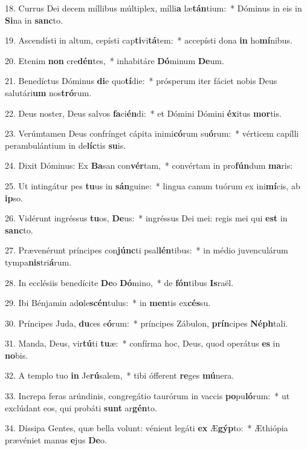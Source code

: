 18. Currus Dei decem míllibus múltiplex, mílli\textbf{a} læ\textbf{tán}tium:~*  Dóminus in eis in \textbf{Si}na in \textbf{sanc}to.\

19. Ascendísti in altum, cepísti cap\textbf{ti}vi\textbf{tá}tem:~*  accepísti dona \textbf{in} ho\textbf{mí}nibus.\

20. Etenim \textbf{non} cre\textbf{dén}tes,~*  inhabitáre \textbf{Dó}minum \textbf{De}um.\

21. Benedíctus Dóminus \textbf{di}e quo\textbf{tí}die:~*  prósperum iter fáciet nobis Deus salutári\textbf{um} nos\textbf{tró}rum.\

22. Deus noster, Deus salvos \textbf{fa}ci\textbf{én}di:~*  et Dómini Dómini \textbf{éx}itus \textbf{mor}tis.\

23. Verúmtamen Deus confrínget cápita inimi\textbf{có}rum su\textbf{ó}rum:~*  vérticem capílli perambulántium in de\textbf{líc}tis \textbf{su}is.\

24. Dixit Dóminus: Ex \textbf{Ba}san con\textbf{vér}tam,~*  convértam in pro\textbf{fún}dum \textbf{ma}ris:\

25. Ut intingátur pes \textbf{tu}us in \textbf{sán}guine:~*  lingua canum tuórum ex ini\textbf{mí}cis, ab \textbf{ip}so.\

26. Vidérunt ingréssus \textbf{tu}os, \textbf{De}us:~*  ingréssus Dei mei: regis mei qui \textbf{est} in \textbf{sanc}to.\

27. Prævenérunt príncipes con\textbf{júnc}ti psal\textbf{lén}tibus:~*  in médio juvenculárum tympa\textbf{nis}tri\textbf{á}rum.\

28. In ecclésiis benedícite \textbf{De}o \textbf{Dó}mino,~*  de \textbf{fón}tibus \textbf{Is}raël.\

29. Ibi Bénjamin ad\textbf{o}le\textbf{scén}tulus:~*  in \textbf{men}tis ex\textbf{cés}su.\

30. Príncipes Juda, \textbf{du}ces e\textbf{ó}rum:~*  príncipes Zábulon, \textbf{prín}cipes \textbf{Néph}tali.\

31. Manda, Deus, vir\textbf{tú}ti \textbf{tu}æ:~*  confírma hoc, Deus, quod operátus \textbf{es} in \textbf{no}bis.\

32. A templo tuo \textbf{in} Je\textbf{rú}salem,~*  tibi ófferent \textbf{re}ges \textbf{mú}nera.\

33. Increpa feras arúndinis, congregátio taurórum in vaccis \textbf{po}pu\textbf{ló}rum:~*  ut exclúdant eos, qui probáti \textbf{sunt} ar\textbf{gén}to.\

34. Díssipa Gentes, quæ bella volunt: vénient legáti \textbf{ex} Æ\textbf{gýp}to:~*  Æthiópia prævéniet manus \textbf{e}jus \textbf{De}o.\

